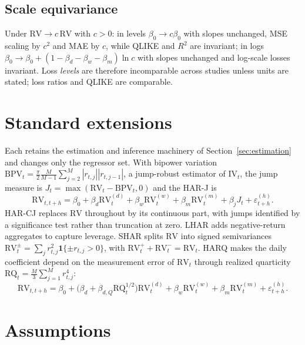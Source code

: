 \documentclass[11pt,a4paper]{article}
\newcommand{\RV}{\mathrm{RV}}
\newcommand{\BPV}{\mathrm{BPV}}
\newcommand{\RQ}{\mathrm{RQ}}
\newcommand{\IV}{\mathrm{IV}}
\begin{document}
\subsection{Scale equivariance}

Under $\RV\to c\,\RV$ with $c>0$: in levels $\beta_0\to c\beta_0$ with slopes unchanged, MSE
scaling by $c^{2}$ and MAE by $c$, while QLIKE and $R^{2}$ are invariant; in logs
$\beta_0\to\beta_0+(1-\beta_d-\beta_w-\beta_m)\ln c$ with slopes unchanged and log-scale
losses invariant. Loss \emph{levels} are therefore incomparable across studies unless units
are stated; loss ratios and QLIKE are comparable.

\section{Standard extensions}
\label{sec:extensions}

Each retains the estimation and inference machinery of Section~\ref{sec:estimation} and
changes only the regressor set. With bipower variation
$\BPV_t=\tfrac{\pi}{2}\tfrac{M}{M-1}\sum_{j=2}^{M}|r_{t,j}||r_{t,j-1}|$, a jump-robust
estimator of $\IV_t$, the jump measure is $J_t=\max(\RV_t-\BPV_t,0)$ and the HAR-J is
\begin{equation}
  \RV_{t,t+h}=\beta_0+\beta_d\RV^{(d)}_t+\beta_w\RV^{(w)}_t+\beta_m\RV^{(m)}_t
  +\beta_j J_t+\varepsilon^{(h)}_{t+h}.
  \label{eq:harj}
\end{equation}
HAR-CJ replaces $\RV$ throughout by its continuous part, with jumps identified by a
significance test rather than truncation at zero. LHAR adds negative-return aggregates to
capture leverage. SHAR splits $\RV$ into signed semivariances
$\RV^{\pm}_t=\sum_j r_{t,j}^{2}\mathbf{1}\{\pm r_{t,j}>0\}$, with $\RV^{+}_t+\RV^{-}_t=\RV_t$.
HARQ makes the daily coefficient depend on the measurement error of $\RV_t$ through realized
quarticity $\RQ_t=\tfrac{M}{3}\sum_{j=1}^{M}r_{t,j}^{4}$:
\begin{equation}
  \RV_{t,t+h}=\beta_0+\bigl(\beta_d+\beta_{d,Q}\RQ_t^{1/2}\bigr)\RV^{(d)}_t
  +\beta_w\RV^{(w)}_t+\beta_m\RV^{(m)}_t+\varepsilon^{(h)}_{t+h}.
  \label{eq:harq}
\end{equation}

\section{Assumptions}
\label{sec:assumptions}
\end{document}
